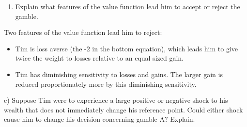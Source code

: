 \documentclass[
  letterpaper,
  DIV=11,
  numbers=noendperiod]{scrreprt}
\providecommand{\tightlist}{%
  \setlength{\itemsep}{0pt}\setlength{\parskip}{0pt}}\usepackage{longtable,booktabs,array}
\begin{document}
\begin{enumerate}
\def\labelenumi{\roman{enumi})}
\setcounter{enumi}{1}
\tightlist
\item
  Explain what features of the value function lead him to accept or
  reject the gamble.
\end{enumerate}

\begin{tcolorbox}[enhanced jigsaw, title=\textcolor{quarto-callout-tip-color}{\faLightbulb}\hspace{0.5em}{Answer}, toprule=.15mm, colback=white, breakable, titlerule=0mm, colframe=quarto-callout-tip-color-frame, coltitle=black, opacityback=0, rightrule=.15mm, colbacktitle=quarto-callout-tip-color!10!white, bottomtitle=1mm, opacitybacktitle=0.6, arc=.35mm, bottomrule=.15mm, toptitle=1mm, leftrule=.75mm, left=2mm]

Two features of the value function lead him to reject:

\begin{itemize}
\tightlist
\item
  Tim is loss averse (the -2 in the bottom equation), which leads him to
  give twice the weight to losses relative to an equal sized gain.
\item
  Tim has diminishing sensitivity to losses and gains. The larger gain
  is reduced proportionately more by this diminishing sensitivity.
\end{itemize}

\end{tcolorbox}

c) Suppose Tim were to experience a large positive or negative shock to
his wealth that does not immediately change his reference point. Could
either shock cause him to change his decision concerning gamble A?
Explain.
\end{document}

